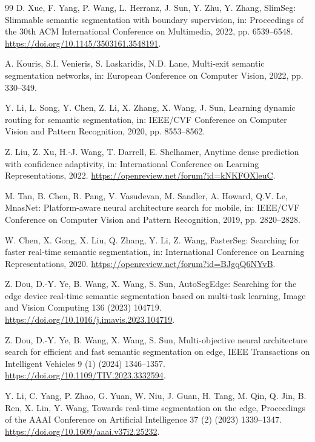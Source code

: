 \documentclass[a4paper,review,12pt]{elsarticle}
\begin{document}
\begin{thebibliography}{99}
D. Xue, F. Yang, P. Wang, L. Herranz, J. Sun, Y. Zhu, Y. Zhang,
SlimSeg: Slimmable semantic segmentation with boundary supervision,
in: Proceedings of the 30th ACM International Conference on Multimedia, 2022, pp. 6539--6548.
\url{https://doi.org/10.1145/3503161.3548191}.

A. Kouris, S.I. Venieris, S. Laskaridis, N.D. Lane,
Multi-exit semantic segmentation networks,
in: European Conference on Computer Vision, 2022, pp. 330--349.

Y. Li, L. Song, Y. Chen, Z. Li, X. Zhang, X. Wang, J. Sun,
Learning dynamic routing for semantic segmentation,
in: IEEE/CVF Conference on Computer Vision and Pattern Recognition, 2020, pp. 8553--8562.

Z. Liu, Z. Xu, H.-J. Wang, T. Darrell, E. Shelhamer,
Anytime dense prediction with confidence adaptivity,
in: International Conference on Learning Representations, 2022.
\url{https://openreview.net/forum?id=kNKFOXleuC}.

M. Tan, B. Chen, R. Pang, V. Vasudevan, M. Sandler, A. Howard, Q.V. Le,
MnasNet: Platform-aware neural architecture search for mobile,
in: IEEE/CVF Conference on Computer Vision and Pattern Recognition, 2019, pp. 2820--2828.

W. Chen, X. Gong, X. Liu, Q. Zhang, Y. Li, Z. Wang,
FasterSeg: Searching for faster real-time semantic segmentation,
in: International Conference on Learning Representations, 2020.
\url{https://openreview.net/forum?id=BJgqQ6NYvB}.

Z. Dou, D.-Y. Ye, B. Wang, X. Wang, S. Sun,
AutoSegEdge: Searching for the edge device real-time semantic segmentation based on multi-task learning,
Image and Vision Computing 136 (2023) 104719.
\url{https://doi.org/10.1016/j.imavis.2023.104719}.

Z. Dou, D.-Y. Ye, B. Wang, X. Wang, S. Sun,
Multi-objective neural architecture search for efficient and fast semantic segmentation on edge,
IEEE Transactions on Intelligent Vehicles 9 (1) (2024) 1346--1357.
\url{https://doi.org/10.1109/TIV.2023.3332594}.

Y. Li, C. Yang, P. Zhao, G. Yuan, W. Niu, J. Guan, H. Tang, M. Qin, Q. Jin, B. Ren, X. Lin, Y. Wang,
Towards real-time segmentation on the edge,
Proceedings of the AAAI Conference on Artificial Intelligence 37 (2) (2023) 1339--1347.
\url{https://doi.org/10.1609/aaai.v37i2.25232}.


\end{thebibliography}
\end{document}
